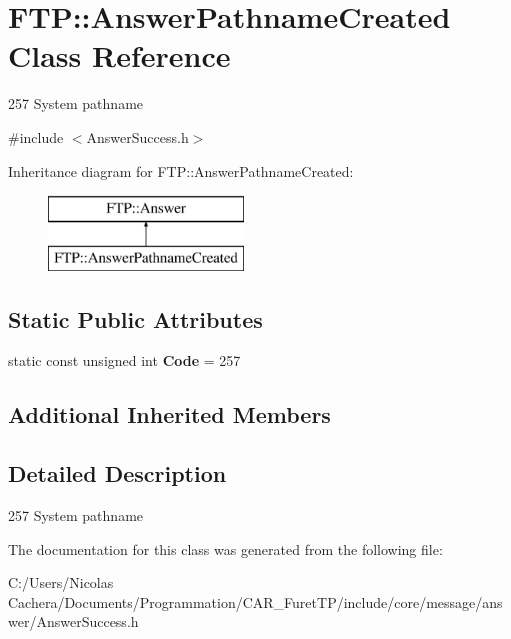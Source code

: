 \hypertarget{classFTP_1_1AnswerPathnameCreated}{}\section{F\+T\+P\+:\+:Answer\+Pathname\+Created Class Reference}
\label{classFTP_1_1AnswerPathnameCreated}


257 System pathname  




{\ttfamily \#include $<$Answer\+Success.\+h$>$}

Inheritance diagram for F\+T\+P\+:\+:Answer\+Pathname\+Created\+:\begin{figure}[H]
\begin{center}
\leavevmode
\includegraphics[height=2.000000cm]{classFTP_1_1AnswerPathnameCreated}
\end{center}
\end{figure}
\subsection*{Static Public Attributes}
\begin{DoxyCompactItemize}
\item 
\hypertarget{classFTP_1_1AnswerPathnameCreated_a318289d8af475a7ff1b55b0a7cddc503}{}static const unsigned int {\bfseries Code} = 257\label{classFTP_1_1AnswerPathnameCreated_a318289d8af475a7ff1b55b0a7cddc503}

\end{DoxyCompactItemize}
\subsection*{Additional Inherited Members}


\subsection{Detailed Description}
257 System pathname 

The documentation for this class was generated from the following file\+:\begin{DoxyCompactItemize}
\item 
C\+:/\+Users/\+Nicolas Cachera/\+Documents/\+Programmation/\+C\+A\+R\+\_\+\+Furet\+T\+P/include/core/message/answer/Answer\+Success.\+h\end{DoxyCompactItemize}
